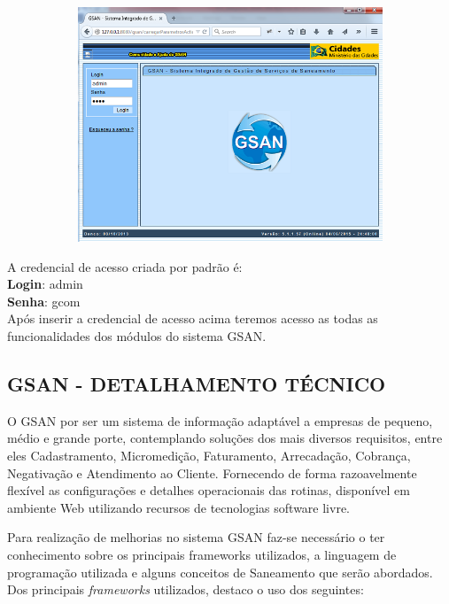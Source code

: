 \begin{figure}[H]
	\centering
	\caption{\textbf{Acessando página inicial do Sistema}}
	\label{figura:acessoPaginaInicial}
	\begin{subfigure}[H]{\textwidth}
		\centering
	\includegraphics{figuras/gsan_online.png}	
	\end{subfigure}
\end{figure}	


A credencial de acesso criada por padrão é: \\
\textbf{Login}: admin \\
\textbf{Senha}: gcom \\
Após inserir a credencial de acesso acima teremos acesso as todas as funcionalidades dos módulos do sistema GSAN.


\subsection{\textbf{\uppercase{GSAN - DETALHAMENTO TÉCNICO}}}

O GSAN por ser um sistema de informação adaptável a empresas de pequeno, médio e grande porte, contemplando soluções dos mais diversos requisitos, entre eles Cadastramento, Micromedição, Faturamento, Arrecadação, Cobrança, Negativação e Atendimento ao Cliente. Fornecendo de forma razoavelmente flexível as configurações e detalhes operacionais das rotinas, disponível em ambiente Web utilizando recursos de tecnologias software livre.

Para realização de melhorias no sistema GSAN faz-se necessário o ter conhecimento sobre os principais frameworks utilizados, a linguagem de programação utilizada e alguns conceitos de Saneamento que serão abordados.
Dos principais \textit{frameworks} utilizados, destaco o uso dos seguintes: \\

